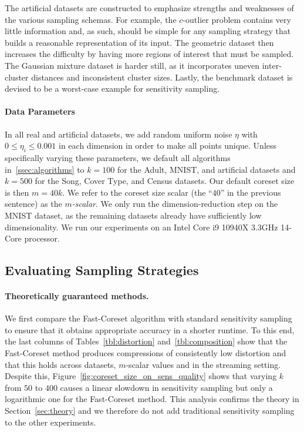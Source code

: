 The artificial datasets are constructed to emphasize strengths and weaknesses of the various sampling schemas. For example, the $c$-outlier problem contains
very little information and, as such, should be simple for any sampling strategy that builds a reasonable representation of its input. The geometric dataset
then increases the difficulty by having more regions of interest that must be sampled. The Gaussian mixture dataset is
harder still, as it incorporates uneven inter-cluster distances and inconsistent cluster sizes. Lastly, the benchmark dataset is devised to be a worst-case
example for sensitivity sampling.

\paragraph*{Data Parameters}
\label{app:data_params}

In all real and artificial datasets, we add random uniform noise $\eta$ with $0 \leq \eta_i \leq 0.001$ in each dimension in order to make all points unique.
Unless specifically varying these parameters, we default all algorithms in~\ref{ssec:algorithms} to $k=100$ for the Adult, MNIST, and artificial datasets and
$k=500$ for the Song, Cover Type, and Census datasets. Our default coreset size is then $m = 40k$. We refer to the coreset size scalar (the ``$40$'' in the
previous sentence) as the \emph{$m$-scalar}.  We only run the dimension-reduction step on the MNIST dataset, as the remaining datasets already have sufficiently
low dimensionality.  We run our experiments on an Intel Core i9 10940X 3.3GHz 14-Core processor.

\subsection{Evaluating Sampling Strategies}
\label{ssec:alg_qualities}

\paragraph*{Theoretically guaranteed methods.}

We first compare the Fast-Coreset algorithm with standard sensitivity sampling to ensure that it obtains appropriate accuracy in a shorter runtime.  To this
end, the last columns of Tables~\ref{tbl:distortion} and~\ref{tbl:composition} show that the Fast-Coreset method produces compressions of consistently low
distortion and that this holds across datasets, $m$-scalar values and in the streaming setting.  Despite this, Figure~\ref{fig:coreset_size_on_sens_quality}
shows that varying $k$ from $50$ to $400$ causes a linear slowdown in sensitivity sampling but only a logarithmic one for the Fast-Coreset method. This analysis
confirms the theory in Section~\ref{sec:theory} and we therefore do not add traditional sensitivity sampling to the other experiments.


